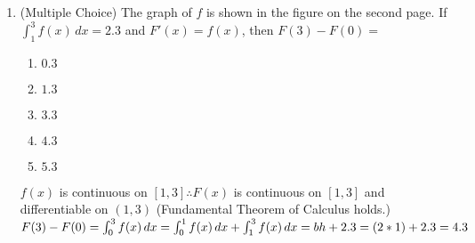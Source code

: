 \documentclass[10pt, letterpaper]{report}
\begin{document}
\begin{enumerate}
	\item{(Multiple Choice) The graph of $f$ is shown in the figure on the second page. If $\int_{1}^{3}{f(x)}\,dx=2.3$ and $F'(x)=f(x)$, then $F(3)-F(0)=$} \\
		\begin{enumerate}
			\item{$0.3$}
			\item{$1.3$}
			\item{$3.3$}
			\item{$4.3$}
			\item{$5.3$\\}
		\end{enumerate}

    $f(x)$ is continuous on $[1,3]\therefore F(x)$ is continuous on $[1,3]$ and differentiable on $(1,3)$ (Fundamental Theorem of Calculus holds.) \\

		$F(3)-F(0)=
    \int_{0}^{3}{f(x)}\,dx=
    \int_{0}^{1}{f(x)}\,dx+\int_{1}^{3}{f(x)}\,dx=
    bh+2.3=
    (2*1)+2.3=4.3\\$

\end{enumerate}
\end{document}

